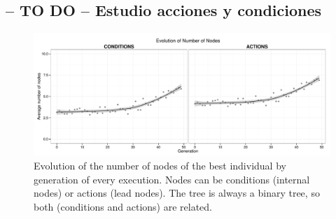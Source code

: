 \documentclass[preprint]{elsarticle}
\begin{document}




\subsection{-- TO DO -- Estudio acciones y condiciones}

 \begin{figure}[ht]
 \begin{center}
   \includegraphics[width=12cm]{nuevas_imgs/estudio_number_nodes.pdf}
 \end{center}
 \caption{Evolution of the number of nodes of the best individual by generation of every execution. Nodes can be conditions (internal nodes) or actions (lead nodes). The tree is always a binary tree, so both (conditions and actions) are related.}
 \label{figura:e_number_nodes}
 \end{figure}
\end{document}
